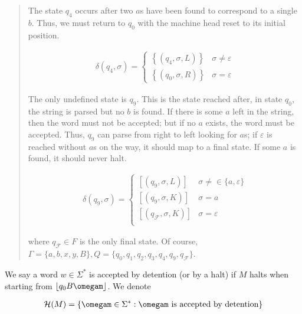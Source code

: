 \documentclass[a4paper, 12pt]{article}
\begin{document}
\begin{quote}
The state $q_4$ occurs after two $a$s have been found to correspond to a single
$b$. Thus, we must return to $q_0$ with the machine head reset to its initial
position. 

\begin{align*}
    \delta(q_4, \sigma) = \begin{cases}
        \left\{ \left( q_4, \sigma, L \right)  \right\} & \sigma \neq \varepsilon
        \\
        \left\{ \left( q_0, \sigma, R \right)  \right\} & \sigma = \varepsilon 
    \end{cases}
\end{align*}

The only undefined state is $q_9$. This is the state reached after, in state
$q_0$, the string is parsed but no $b$ is found. If there is some $a$ left in
the string, then the word must not be accepted; but if no $a$ exists, the word
must be accepted. Thus, $q_9$ can parse from right to left looking for $a$s; if
$\varepsilon$ is reached without $a$s on the way, it should map to a final state.
If some $a$ is found, it should never halt.

\begin{align*}
    \delta(q_9, \sigma) = \begin{cases}
        \left[ \left( q_9, \sigma, L \right)   \right] & \sigma \neq\in \{a,
        \varepsilon\} \\
        \left[ \left( q_9, \sigma, K \right)   \right] & \sigma = a \\ 
        \left[ \left( q_\mathcal{F}, \sigma, K \right)   \right] & \sigma = \varepsilon \\ 
    \end{cases}
\end{align*}

where $q_{\mathcal{F}} \in F$ is the only final state. Of course, $\Gamma = \{a,
b, x, y, B\}, Q = \{ q_0, q_1, q_2, q_3, q_4, q_9, q_{\mathcal{F}}\}$.

\end{quote}
\normalsize

We say a word $w \in \Sigma^{*}$ is accepted by detention (or by a halt) if $M$
halts when starting from $ \left\lfloor q_0 B \omegam \right\rfloor  $. We
denote 

\begin{align*}
    \mathcal{H}(M) = \left\{ \omegam \in \Sigma^{*}: \omegam \text{ is accepted
    by detention} \right\} 
\end{align*}
\end{document}

